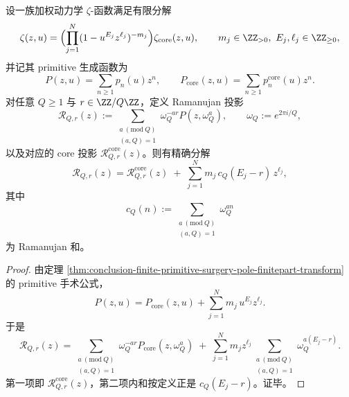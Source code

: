 \begin{theorem}\label{thm:conclusion-ramanujan-finite-cyclotomic-shell-projection}
设一族加权动力学 \(\zeta\)-函数满足有限分解
\[
\zeta(z,u)=
\Bigl(\prod_{j=1}^{N}(1-u^{E_j}z^{\ell_j})^{-m_j}\Bigr)\zeta_{\mathrm{core}}(z,u),
\qquad
m_j\in \ZZ_{>0},\ E_j,\ell_j\in \ZZ_{\ge 0},
\]
并记其 primitive 生成函数为
\[
P(z,u)=\sum_{n\ge 1}p_n(u)z^n,
\qquad
P_{\mathrm{core}}(z,u)=\sum_{n\ge 1}p_n^{\mathrm{core}}(u)z^n.
\]
对任意 \(Q\ge 1\) 与 \(r\in \ZZ/Q\ZZ\)，定义 Ramanujan 投影
\[
\mathcal R_{Q,r}(z)
:=
\sum_{\substack{a\ (\mathrm{mod}\ Q)\\ (a,Q)=1}}
\omega_Q^{-ar}P(z,\omega_Q^a),
\qquad
\omega_Q:=e^{2\pi i/Q},
\]
以及对应的 core 投影 \(\mathcal R_{Q,r}^{\mathrm{core}}(z)\)。则有精确分解
\[
\mathcal R_{Q,r}(z)
=
\mathcal R_{Q,r}^{\mathrm{core}}(z)
\;+\;
\sum_{j=1}^{N}m_j\,c_Q(E_j-r)\,z^{\ell_j},
\]
其中
\[
c_Q(n):=
\sum_{\substack{a\ (\mathrm{mod}\ Q)\\ (a,Q)=1}}\omega_Q^{an}
\]
为 Ramanujan 和。
\end{theorem}
\begin{proof}
由定理 \ref{thm:conclusion-finite-primitive-surgery-pole-finitepart-transform} 的 primitive 手术公式，
\[
P(z,u)=P_{\mathrm{core}}(z,u)+\sum_{j=1}^{N}m_j\,u^{E_j}z^{\ell_j}.
\]
于是
\[
\mathcal R_{Q,r}(z)
=
\sum_{\substack{a\ (\mathrm{mod}\ Q)\\ (a,Q)=1}}
\omega_Q^{-ar}P_{\mathrm{core}}(z,\omega_Q^a)
\;+\;
\sum_{j=1}^{N}m_j z^{\ell_j}
\sum_{\substack{a\ (\mathrm{mod}\ Q)\\ (a,Q)=1}}
\omega_Q^{a(E_j-r)}.
\]
第一项即 \(\mathcal R_{Q,r}^{\mathrm{core}}(z)\)，第二项内和按定义正是 \(c_Q(E_j-r)\)。证毕。
\end{proof}

